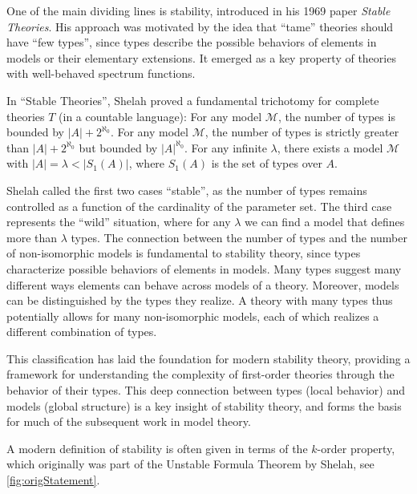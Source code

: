 \begin{remark}
\begin{outline}
    \0 One of the main dividing lines is stability, introduced in his 1969 paper \emph{Stable Theories}. His approach was motivated by the idea that \enquote{tame} theories should have \enquote{few types}, since types describe the possible behaviors of elements in models or their elementary extensions. It emerged as a key property of theories with well-behaved spectrum functions.
    
    \0 In \enquote{Stable Theories}, Shelah proved a fundamental trichotomy for complete theories $T$ (in a countable language):
        \1 For any model $\mathcal{M}$, the number of types is bounded by $|A|+2^{\aleph_0}$.
        \1 For any model $\mathcal{M}$, the number of types is strictly greater than $|A|+2^{\aleph_0}$ but bounded by $|A|^{\aleph_0}$.
        \1 For any infinite $\lambda$, there exists a model $\mathcal{M}$ with $|A|=\lambda < |S_1(A)|$, where $S_1(A)$ is the set of types over $A$.
    
    \0 Shelah called the first two cases \enquote{stable}, as the number of types remains controlled as a function of the cardinality of the parameter set. The third case represents the \enquote{wild} situation, where for any $\lambda$ we can find a model that defines more than $\lambda$ types. The connection between the number of types and the number of non-isomorphic models is fundamental to stability theory, since types characterize possible behaviors of elements in models. Many types suggest many different ways elements can behave across models of a theory. Moreover, models can be distinguished by the types they realize. A theory with many types thus potentially allows for many non-isomorphic models, each of which realizes a different combination of types.
    
    \0 This classification has laid the foundation for modern stability theory, providing a framework for understanding the complexity of first-order theories through the behavior of their types. This deep connection between types (local behavior) and models (global structure) is a key insight of stability theory, and forms the basis for much of the subsequent work in model theory.
\end{outline}
\end{remark}

A modern definition of stability is often given in terms of the $k$-order property, which originally was part of the Unstable Formula Theorem by Shelah, see \cref{fig:origStatement}.

